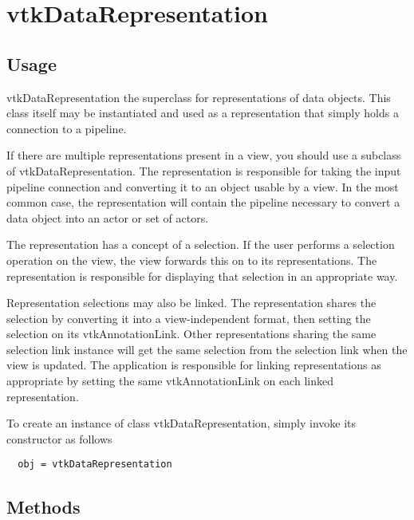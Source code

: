 \section{vtkDataRepresentation}

\subsection{Usage}

 vtkDataRepresentation the superclass for representations of data objects.
 This class itself may be instantiated and used as a representation
 that simply holds a connection to a pipeline.

 If there are multiple representations present in a view, you should use
 a subclass of vtkDataRepresentation.  The representation is
 responsible for taking the input pipeline connection and converting it
 to an object usable by a view.  In the most common case, the representation
 will contain the pipeline necessary to convert a data object into an actor
 or set of actors.

 The representation has a concept of a selection.  If the user performs a
 selection operation on the view, the view forwards this on to its
 representations.  The representation is responsible for displaying that
 selection in an appropriate way.

 Representation selections may also be linked.  The representation shares
 the selection by converting it into a view-independent format, then
 setting the selection on its vtkAnnotationLink.  Other representations
 sharing the same selection link instance will get the same selection
 from the selection link when the view is updated.  The application is
 responsible for linking representations as appropriate by setting the
 same vtkAnnotationLink on each linked representation.

To create an instance of class vtkDataRepresentation, simply
invoke its constructor as follows
\begin{verbatim}
  obj = vtkDataRepresentation
\end{verbatim}
\subsection{Methods}

